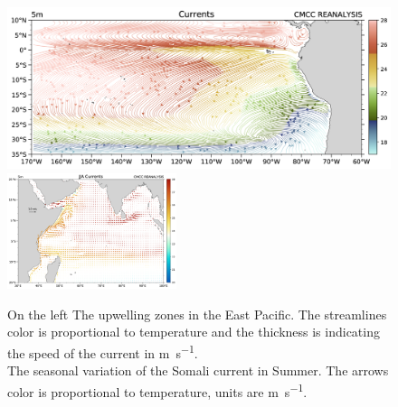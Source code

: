 \begin{figure}
	\centering
	\includegraphics[width = 0.53 \textwidth]{figs/upwelling-zones-east-pacific}
	\hfill
	\includegraphics[width = 0.44\textwidth]{figs/somali-current-summer}
	\caption{On the left The upwelling zones in the East Pacific. The streamlines color is proportional to temperature and the thickness is indicating the speed of the current in \unit{\meter \per \second}.\\
		The seasonal variation of the Somali current in Summer. The arrows color is proportional to temperature, units are \unit{\meter \per \second}.} \label{fig:upwelzone-somali}
\end{figure}


